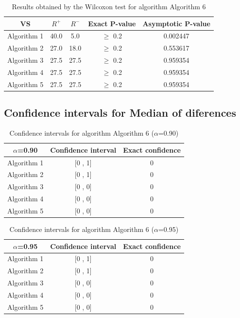 \documentclass[a4paper,10pt]{article}
\begin{document}
\begin{table}[!htp]
\centering\small
\begin{tabular}{
|c|c|c|c|c|}
\hline
 VS & $R^{+}$ & $R^{-}$ & Exact P-value & Asymptotic P-value \\ \hline 
Algorithm 1 & 40.0 & 5.0 & $\geq$ 0.2 & 0.002447\\ \hline 
Algorithm 2 & 27.0 & 18.0 & $\geq$ 0.2 & 0.553617\\ \hline 
Algorithm 3 & 27.5 & 27.5 & $\geq$ 0.2 & 0.959354\\ \hline 
Algorithm 4 & 27.5 & 27.5 & $\geq$ 0.2 & 0.959354\\ \hline 
Algorithm 5 & 27.5 & 27.5 & $\geq$ 0.2 & 0.959354\\ \hline 

\end{tabular}
\caption{Results obtained by the Wilcoxon test for algorithm Algorithm 6}
\end{table}

\subsection{Confidence intervals for Median of diferences}

\begin{table}[!htp]
\centering\small
\begin{tabular}{
|c|c|c|}
\hline
 $\alpha$=0.90 & Confidence interval & Exact confidence \\ \hline 
Algorithm 1 & [0 , 1] & 0\\ \hline 
Algorithm 2 & [0 , 1] & 0\\ \hline 
Algorithm 3 & [0 , 0] & 0\\ \hline 
Algorithm 4 & [0 , 0] & 0\\ \hline 
Algorithm 5 & [0 , 0] & 0\\ \hline 

\end{tabular}
\caption{Confidence intervals for algorithm Algorithm 6 ($\alpha$=0.90)}
\end{table}
\begin{table}[!htp]
\centering\small
\begin{tabular}{
|c|c|c|}
\hline
 $\alpha$=0.95 & Confidence interval & Exact confidence \\ \hline 
Algorithm 1 & [0 , 1] & 0\\ \hline 
Algorithm 2 & [0 , 1] & 0\\ \hline 
Algorithm 3 & [0 , 0] & 0\\ \hline 
Algorithm 4 & [0 , 0] & 0\\ \hline 
Algorithm 5 & [0 , 0] & 0\\ \hline 

\end{tabular}
\caption{Confidence intervals for algorithm Algorithm 6 ($\alpha$=0.95)}
\end{table}

 \clearpage 
\end{document}
